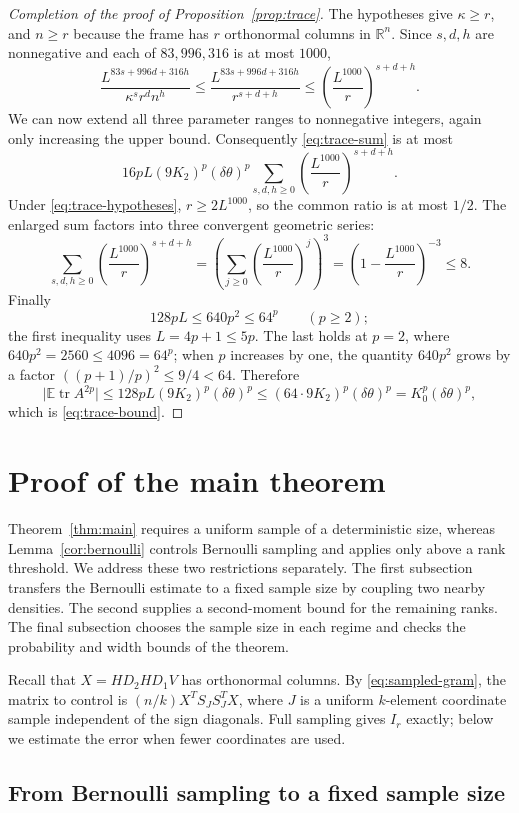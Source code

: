 \documentclass[11pt]{article}
\theoremstyle{definition}
\theoremstyle{remark}
\theoremstyle{plain}
\newcommand{\E}{\mathbb E}
\newcommand{\R}{\mathbb R}
\DeclareMathOperator{\tr}{tr}
\begin{document}
\begin{proof}[Completion of the proof of Proposition~\ref{prop:trace}]
The hypotheses give $\kappa\ge r$, and $n\ge r$ because the
frame has $r$ orthonormal columns in $\R^n$. Since $s,d,h$ are
nonnegative and each of $83,996,316$ is at most $1000$,
\[
 \frac{L^{83s+996d+316h}}{\kappa^s r^d n^h}
   \le\frac{L^{83s+996d+316h}}{r^{s+d+h}}
   \le\left(\frac{L^{1000}}r\right)^{s+d+h}.
\]
We can now extend all three parameter ranges to nonnegative
integers, again only increasing the upper bound. Consequently
\eqref{eq:trace-sum} is at most
\[
 16pL(9K_2)^p(\delta\theta)^p
          \sum_{s,d,h\ge0}\left(\frac{L^{1000}}r\right)^{s+d+h}.
\]
Under \eqref{eq:trace-hypotheses}, $r\ge2L^{1000}$, so the common
ratio is at most $1/2$. The enlarged sum factors into three
convergent geometric series:
\[
 \sum_{s,d,h\ge0}\left(\frac{L^{1000}}r\right)^{s+d+h}
   =\left(\sum_{j\ge0}\left(\frac{L^{1000}}r\right)^j\right)^3
   =\left(1-\frac{L^{1000}}r\right)^{-3}\le8.
\]
Finally
\[
 128pL\le640p^2\le64^p\qquad(p\ge2);
\]
the first inequality uses $L=4p+1\le5p$. The last holds at $p=2$,
where $640p^2=2560\le4096=64^p$; when $p$ increases by one,
the quantity $640p^2$ grows by a factor $((p+1)/p)^2\le9/4<64$.
Therefore
\[
 \bigl|\E\tr A^{2p}\bigr|
    \le128pL(9K_2)^p(\delta\theta)^p
    \le(64\cdot9K_2)^p(\delta\theta)^p
    =K_0^p(\delta\theta)^p,
\]
which is \eqref{eq:trace-bound}.
\end{proof}

\section{Proof of the main theorem}\label{sec:main-proof}

Theorem~\ref{thm:main} requires a uniform sample of a deterministic
size, whereas Lemma~\ref{cor:bernoulli} controls Bernoulli sampling
and applies only above a rank threshold. We address these two
restrictions separately. The first subsection transfers the Bernoulli
estimate to a fixed sample size by coupling two nearby densities.
The second supplies a second-moment bound for the remaining ranks.
The final subsection chooses the sample size in each regime and
checks the probability and width bounds of the theorem.

Recall that $X=HD_2HD_1V$ has orthonormal columns. By
\eqref{eq:sampled-gram}, the matrix to control is
$(n/k)X^TS_JS_J^TX$, where $J$ is a uniform $k$-element coordinate
sample independent of the sign diagonals. Full sampling gives $I_r$
exactly; below we estimate the error when fewer coordinates are used.

\subsection{From Bernoulli sampling to a fixed sample size}
\end{document}
